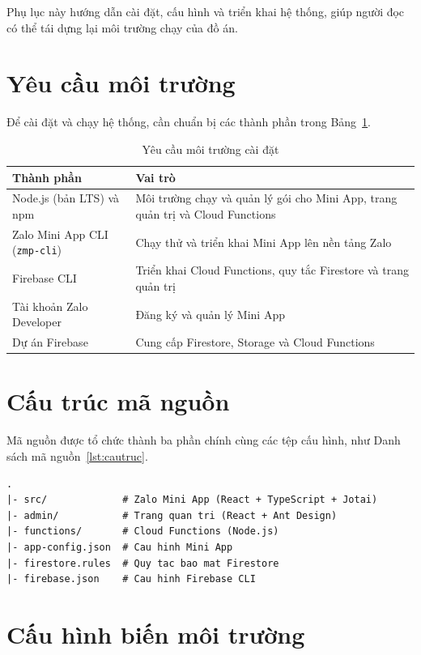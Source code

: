 \documentclass[../main.tex]{subfiles}
\begin{document}
Phụ lục này hướng dẫn cài đặt, cấu hình và triển khai hệ thống, giúp người đọc có thể tái
dựng lại môi trường chạy của đồ án.

\section{Yêu cầu môi trường}

Để cài đặt và chạy hệ thống, cần chuẩn bị các thành phần trong Bảng~\ref{tab:moi-truong}.

\begin{table}[H]
\centering
\small
\caption{Yêu cầu môi trường cài đặt}
\label{tab:moi-truong}
\begin{tabular}{|p{4.6cm}|p{9cm}|}
\hline
\textbf{Thành phần} & \textbf{Vai trò} \\ \hline
Node.js (bản LTS) và npm & Môi trường chạy và quản lý gói cho Mini App, trang quản trị và Cloud Functions \\ \hline
Zalo Mini App CLI (\texttt{zmp-cli}) & Chạy thử và triển khai Mini App lên nền tảng Zalo \\ \hline
Firebase CLI & Triển khai Cloud Functions, quy tắc Firestore và trang quản trị \\ \hline
Tài khoản Zalo Developer & Đăng ký và quản lý Mini App \\ \hline
Dự án Firebase & Cung cấp Firestore, Storage và Cloud Functions \\ \hline
\end{tabular}
\end{table}

\section{Cấu trúc mã nguồn}

Mã nguồn được tổ chức thành ba phần chính cùng các tệp cấu hình, như Danh sách mã nguồn~\ref{lst:cautruc}.

\begin{lstlisting}[caption={Cấu trúc thư mục mã nguồn},captionpos=b,label=lst:cautruc]
.
|- src/             # Zalo Mini App (React + TypeScript + Jotai)
|- admin/           # Trang quan tri (React + Ant Design)
|- functions/       # Cloud Functions (Node.js)
|- app-config.json  # Cau hinh Mini App
|- firestore.rules  # Quy tac bao mat Firestore
|- firebase.json    # Cau hinh Firebase CLI
\end{lstlisting}

\section{Cấu hình biến môi trường}
\end{document}
